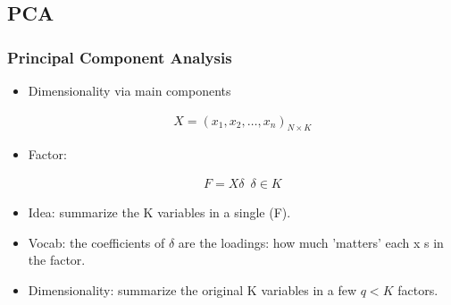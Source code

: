 \documentclass[
  shownotes,
  xcolor={svgnames},
  hyperref={colorlinks,citecolor=DarkBlue,linkcolor=DarkRed,urlcolor=DarkBlue}
  , aspectratio=169]{beamer}
\begin{document}
\subsection{PCA}
\begin{frame}
\frametitle{Principal Component Analysis}

\begin{itemize}

  \item Dimensionality via main components

  \begin{align}
  X = (x_1 , x_2 , \dots , x_n )_{N \times K}
  \end{align}

  \item Factor: 

  \begin{align}
  F = X\delta \,\,\,\delta \in K
  \end{align}


  \item Idea: summarize the K variables in a single (F).
  \item Vocab: the coefficients of $\delta$ are the loadings: how much 'matters' each x s in the factor.
  \item Dimensionality: summarize the original K variables in a few $q <K$ factors.
  \end{itemize}

\end{frame}
\end{document}
